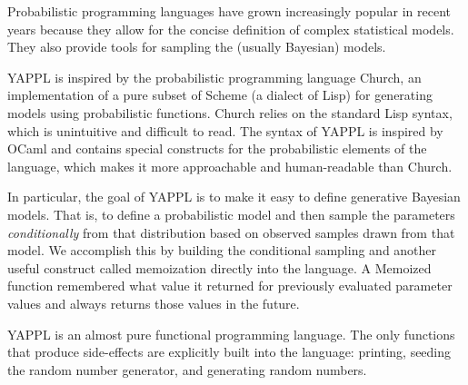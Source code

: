 Probabilistic programming languages have grown increasingly popular in recent years because they allow for the concise definition of complex statistical models. They also provide tools for sampling the (usually Bayesian) models. 

YAPPL is inspired by the probabilistic programming language Church, an implementation of a pure subset of Scheme (a dialect of Lisp) for generating models using probabilistic functions. Church relies  on the standard Lisp syntax, which is unintuitive and difficult to read. The syntax of YAPPL is inspired by OCaml and contains special constructs for the probabilistic elements of the language, which makes it more approachable and human-readable than Church. 

In particular, the goal of YAPPL is to make it easy to define generative Bayesian models. That is, to define a probabilistic model and then sample the parameters {\em conditionally} from that distribution based on observed samples drawn from that model. We accomplish this by building the conditional sampling and another useful construct called memoization directly into the language. A Memoized function remembered what value it returned for previously evaluated parameter values and always returns those values in the future.  

YAPPL is an almost pure functional programming language. The only functions that produce side-effects are explicitly built into the language: printing, seeding the random number generator, and generating random numbers. 
